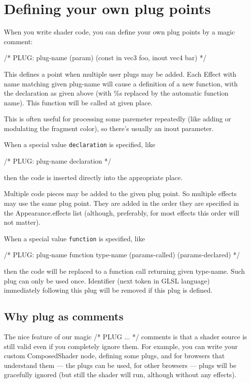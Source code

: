 \documentclass{acmsiggraph}                     %
\begin{document}
\section{Defining your own plug points}

When you write shader code, you can define your own plug points by a
magic comment:

/* PLUG: plug-name (param) (const in vec3 foo, inout vec4 bar) */

This defines a point when multiple user plugs may be added. Each
Effect with name matching given plug-name will cause a
definition of a new function, with the declaration as given above
(with \%s replaced by the automatic function name). This function will
be called at given place.

This is often useful for processing some paremeter
repeatedly (like adding or modulating the fragment color),
so there's usually an inout parameter.

When a special value \texttt{declaration} is specified, like

/* PLUG: plug-name declaration */

then the code is inserted directly into the appropriate place.

Multiple code pieces may be added to the given plug point.
So multiple effects may use the same plug point. They are added
in the order they are specified in the Appearance.effects list
(although, preferably, for most effects this order will not matter).

When a special value \texttt{function} is specified, like

/* PLUG: plug-name function type-name (params-called) (params-declared) */

then the code will be replaced to a function call returning given type-name.
Such plug can only be used once.
Identifier (next token in GLSL language) immediately following
this plug will be removed if this plug is defined.

\subsection{Why plug as comments}

The nice feature of our magic /* PLUG ... */ comments is that a shader source
is still valid even if you completely ignore them. For example,
you can write your custom ComposedShader node, defining some plugs,
and for browsers that understand them --- the plugs can be used,
for other browsers --- plugs will be gracefully ignored (but still
the shader will run, although without any effects).
\end{document}
